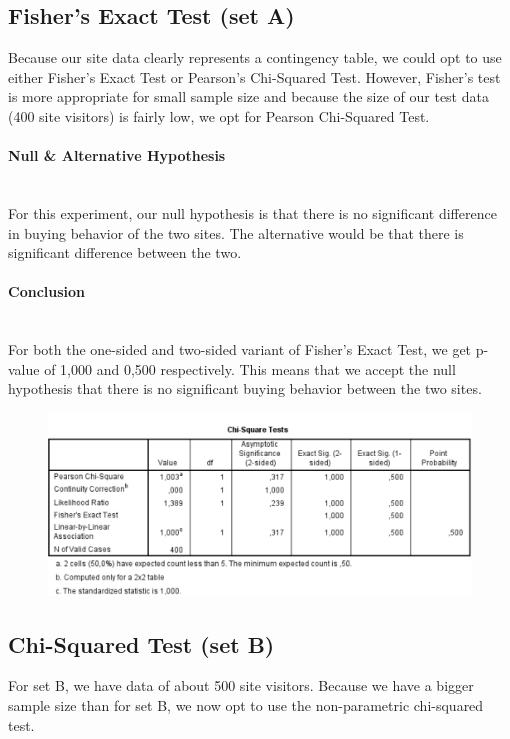 \documentclass[14]{article}
\begin{document}
\subsection{Fisher's Exact Test (set A)}
Because our site data clearly represents a contingency table, we could opt to use either Fisher's Exact Test or Pearson's Chi-Squared Test. However, Fisher's test is more appropriate for small sample size and because the size of our test data (400 site visitors) is fairly low, we opt for Pearson Chi-Squared Test.

\paragraph{Null \& Alternative Hypothesis}\mbox{}\\
For this experiment, our null hypothesis is that there is no significant difference in buying behavior of the two sites. The alternative would be that there is significant difference between the two.

\paragraph{Conclusion}\mbox{}\\
For both the one-sided and two-sided variant of Fisher's Exact Test, we get p-value of 1,000 and 0,500 respectively. This means that we accept the null hypothesis that there is no significant buying behavior between the two sites.

\newpage
\begin{figure}[!htb]
	\includegraphics[width=1.0\textwidth]{img/question2/Question2_Chi.PNG}
	\captionsetup{width=1.0\textwidth}
	\centering 
\end{figure}

\subsection{Chi-Squared Test (set B)}
For set B, we have data of about 500 site visitors. Because we have a bigger sample size than for set B, we now opt to use the non-parametric chi-squared test.
\end{document}
